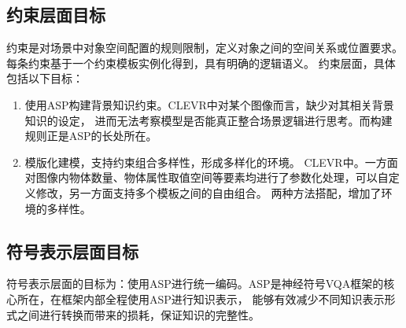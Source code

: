 \subsection{约束层面目标}
约束是对场景中对象空间配置的规则限制，定义对象之间的空间关系或位置要求。
每条约束基于一个约束模板实例化得到，具有明确的逻辑语义。
约束层面，具体包括以下目标：
\begin{enumerate}[nosep]
\item 使用ASP构建背景知识约束。CLEVR中对某个图像而言，缺少对其相关背景知识的设定，
进而无法考察模型是否能真正整合场景逻辑进行思考。而构建规则正是ASP的长处所在。
\item 模版化建模，支持约束组合多样性，形成多样化的环境。
CLEVR中。一方面对图像内物体数量、物体属性取值空间等要素均进行了参数化处理，可以自定义修改，另一方面支持多个模板之间的自由组合。
两种方法搭配，增加了环境的多样性。
\end{enumerate}
\subsection{符号表示层面目标}
符号表示层面的目标为：使用ASP进行统一编码。ASP是神经符号VQA框架的核心所在，在框架内部全程使用ASP进行知识表示，
能够有效减少不同知识表示形式之间进行转换而带来的损耗，保证知识的完整性。
